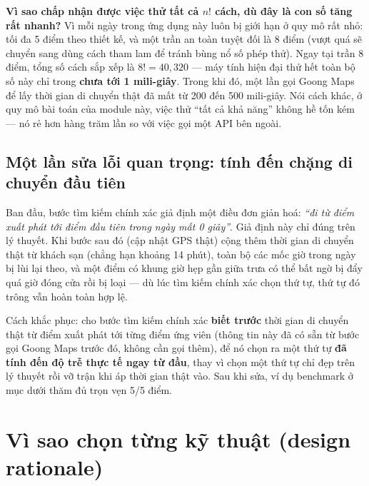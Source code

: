 \documentclass[12pt,a4paper]{article}
\begin{document}
\textbf{Vì sao chấp nhận được việc thử tất cả $n!$ cách, dù đây là con số tăng
rất nhanh?} Vì mỗi ngày trong ứng dụng này luôn bị giới hạn ở quy mô rất nhỏ:
tối đa 5 điểm theo thiết kế, và một trần an toàn tuyệt đối là 8 điểm (vượt quá
sẽ chuyển sang dùng cách tham lam để tránh bùng nổ số phép thử). Ngay tại
trần 8 điểm, tổng số cách sắp xếp là $8! = 40{,}320$ --- máy tính hiện đại thử
hết toàn bộ số này chỉ trong \textbf{chưa tới 1 mili-giây}. Trong khi đó, một
lần gọi Goong Maps để lấy thời gian di chuyển thật đã mất từ 200 đến 500 mili-giây.
Nói cách khác, ở quy mô bài toán của module này, việc thử ``tất cả khả năng''
không hề tốn kém --- nó rẻ hơn hàng trăm lần so với việc gọi một API bên ngoài.

\subsection{Một lần sửa lỗi quan trọng: tính đến chặng di chuyển đầu tiên}

Ban đầu, bước tìm kiếm chính xác giả định một điều đơn giản hoá: \textit{``đi
từ điểm xuất phát tới điểm đầu tiên trong ngày mất 0 giây''}. Giả định này chỉ
đúng trên lý thuyết. Khi bước sau đó (cập nhật GPS thật) cộng thêm thời gian
di chuyển thật từ khách sạn (chẳng hạn khoảng 14 phút), toàn bộ các mốc giờ
trong ngày bị lùi lại theo, và một điểm có khung giờ hẹp gần giữa trưa có thể
bất ngờ bị đẩy quá giờ đóng cửa rồi bị loại --- dù lúc tìm kiếm chính xác chọn
thứ tự, thứ tự đó trông vẫn hoàn toàn hợp lệ.

Cách khắc phục: cho bước tìm kiếm chính xác \textbf{biết trước} thời gian di
chuyển thật từ điểm xuất phát tới từng điểm ứng viên (thông tin này đã có sẵn
từ bước gọi Goong Maps trước đó, không cần gọi thêm), để nó chọn ra một thứ tự
\textbf{đã tính đến độ trễ thực tế ngay từ đầu}, thay vì chọn một thứ tự chỉ
đẹp trên lý thuyết rồi vỡ trận khi áp thời gian thật vào. Sau khi sửa, ví dụ
benchmark ở mục dưới thăm đủ trọn vẹn 5/5 điểm.

\section{Vì sao chọn từng kỹ thuật (design rationale)}
\end{document}
